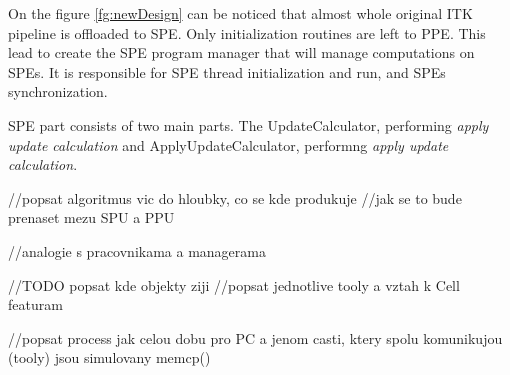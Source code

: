 On the figure \ref{fg:newDesign} can be noticed that almost whole original ITK pipeline is offloaded to SPE. Only initialization routines are left to PPE. This lead to create the SPE program manager that will manage computations on SPEs. It is responsible for SPE thread initialization and run, and SPEs synchronization.

SPE part consists of two main parts. The UpdateCalculator, performing \emph{apply update calculation} and ApplyUpdateCalculator, performng \emph{apply update calculation}.

//popsat algoritmus vic do hloubky, co se kde produkuje
//jak se to bude prenaset mezu SPU a PPU

//analogie s pracovnikama a managerama

//TODO popsat kde objekty ziji
//popsat jednotlive tooly a vztah k Cell featuram

//popsat process jak celou dobu pro PC a jenom casti, ktery spolu komunikujou (tooly) jsou simulovany memcp()